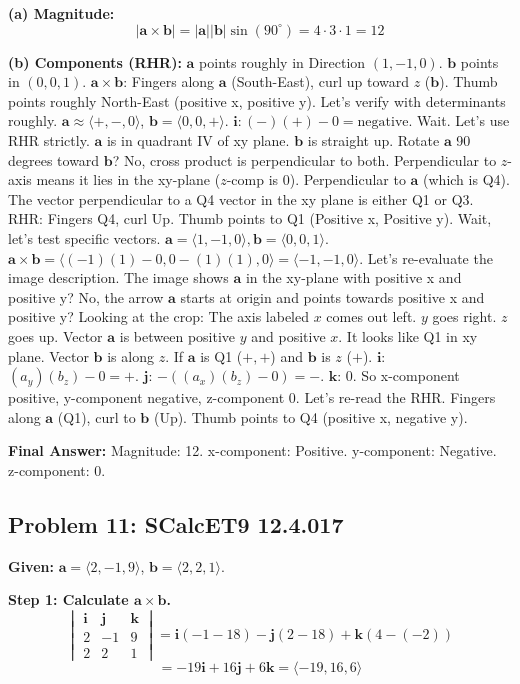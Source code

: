 \documentclass[11pt]{article}
\renewcommand{\vec}[1]{\mathbf{#1}}
\newcommand{\ihat}{\mathbf{i}}
\newcommand{\jhat}{\mathbf{j}}
\newcommand{\khat}{\mathbf{k}}
\begin{document}
\textbf{(a) Magnitude:}
\[
|\vec{a} \times \vec{b}| = |\vec{a}| |\vec{b}| \sin(90^\circ) = 4 \cdot 3 \cdot 1 = 12
\]

\textbf{(b) Components (RHR):}
$\vec{a}$ points roughly in Direction $(1, -1, 0)$. $\vec{b}$ points in $(0, 0, 1)$.
$\vec{a} \times \vec{b}$: Fingers along $\vec{a}$ (South-East), curl up toward $z$ ($\vec{b}$). Thumb points roughly North-East (positive x, positive y).
Let's verify with determinants roughly. $\vec{a} \approx \langle +, -, 0 \rangle$, $\vec{b} = \langle 0, 0, + \rangle$.
$\ihat: (-)(+) - 0 = \text{negative}$. Wait.
Let's use RHR strictly. $\vec{a}$ is in quadrant IV of xy plane. $\vec{b}$ is straight up.
Rotate $\vec{a}$ 90 degrees toward $\vec{b}$? No, cross product is perpendicular to both.
Perpendicular to $z$-axis means it lies in the xy-plane ($z$-comp is 0).
Perpendicular to $\vec{a}$ (which is Q4). The vector perpendicular to a Q4 vector in the xy plane is either Q1 or Q3.
RHR: Fingers Q4, curl Up. Thumb points to Q1 (Positive x, Positive y).
Wait, let's test specific vectors. $\vec{a} = \langle 1, -1, 0 \rangle, \vec{b} = \langle 0, 0, 1 \rangle$.
$\vec{a} \times \vec{b} = \langle (-1)(1)-0, 0-(1)(1), 0 \rangle = \langle -1, -1, 0 \rangle$.
Let's re-evaluate the image description. The image shows $\vec{a}$ in the xy-plane with positive x and positive y? No, the arrow $\vec{a}$ starts at origin and points towards positive x and positive y?
Looking at the crop: The axis labeled $x$ comes out left. $y$ goes right. $z$ goes up.
Vector $\vec{a}$ is between positive $y$ and positive $x$. It looks like Q1 in xy plane.
Vector $\vec{b}$ is along $z$.
If $\vec{a}$ is Q1 ($+,+$) and $\vec{b}$ is $z$ ($+$).
$\ihat$: $(a_y)(b_z) - 0 = +$.
$\jhat$: $-( (a_x)(b_z) - 0 ) = -$.
$\khat$: $0$.
So x-component positive, y-component negative, z-component 0.
Let's re-read the RHR. Fingers along $\vec{a}$ (Q1), curl to $\vec{b}$ (Up). Thumb points to Q4 (positive x, negative y).

\textbf{Final Answer:}
Magnitude: 12.
x-component: Positive.
y-component: Negative.
z-component: 0.

\hrulefill

\subsection*{Problem 11: SCalcET9 12.4.017}
\textbf{Given:} $\vec{a} = \langle 2, -1, 9 \rangle$, $\vec{b} = \langle 2, 2, 1 \rangle$.

\textbf{Step 1: Calculate $\vec{a} \times \vec{b}$.}
\[
\begin{vmatrix} \ihat & \jhat & \khat \\ 2 & -1 & 9 \\ 2 & 2 & 1 \end{vmatrix} = \ihat(-1 - 18) - \jhat(2 - 18) + \khat(4 - (-2))
\]
\[
= -19\ihat + 16\jhat + 6\khat = \langle -19, 16, 6 \rangle
\]
\end{document}
